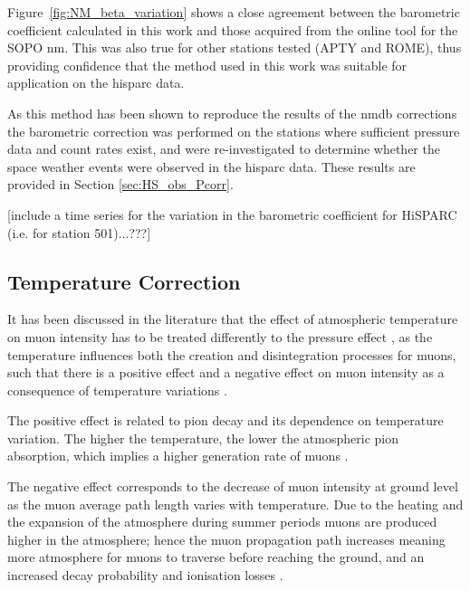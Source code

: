 Figure~\ref{fig:NM_beta_variation} shows a close agreement between the barometric coefficient calculated in this work and those acquired from the online tool for the SOPO \gls{nm}. This was also true for other stations tested (APTY and ROME), thus providing confidence that the method used in this work was suitable for application on the \gls{hisparc} data. 

As this method has been shown to reproduce the results of the \gls{nmdb} corrections the barometric correction was performed on the stations where sufficient pressure data and count rates exist, and were re-investigated to determine whether the space weather events were observed in the \gls{hisparc} data. These results are provided in Section \ref{sec:HS_obs_Pcorr}.


[include a time series for the variation in the barometric coefficient for HiSPARC (i.e. for station 501)...???] 




\subsection{Temperature Correction}\label{sec:HS_T_corr}

It has been discussed in the literature that the effect of atmospheric temperature on muon intensity has to be treated differently to the pressure effect \citep{berkova_temperature_2011}, as the temperature influences both the creation and disintegration processes for muons, such that there is a positive effect and a negative effect on muon intensity as a consequence of temperature variations \citep{mendoncca_temperature_2016}. 

The positive effect is related to pion decay and its dependence on temperature variation. The higher the temperature, the lower the atmospheric pion absorption, which implies a higher generation rate of muons \citep{mendoncca_temperature_2016}.

The negative effect corresponds to the decrease of muon intensity at ground level as the muon average path length varies with temperature. Due to the heating and the expansion of the atmosphere during summer periods muons are produced higher in the atmosphere; hence the muon propagation path increases meaning more atmosphere for muons to traverse before reaching the ground, and an increased decay probability and ionisation losses \citep{savic_pressure_2015, mendoncca_temperature_2016}.

